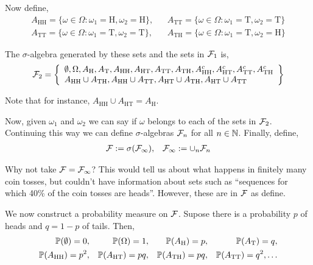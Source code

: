 \documentclass[12pt]{article}
\begin{document}
Now define,
\begin{align*}
    A_{\text{HH}} = \{\omega \in \Omega : \omega_1 = \text{H}, \omega_2 = \text{H} \}, &&
    A_{\text{TT}} = \{\omega \in \Omega : \omega_1 = \text{T}, \omega_2 = \text{T} \} \\
    A_{\text{TT}} = \{\omega \in \Omega : \omega_1 = \text{T}, \omega_2 = \text{T} \}, &&
    A_{\text{TH}} = \{\omega \in \Omega : \omega_1 = \text{T}, \omega_2 = \text{H} \}
\end{align*}

The \( \sigma \)-algebra generated by these sets and the sets in \( \mathcal{F}_1 \) is,
\begin{align*}
    \mathcal{F}_2 = \left\{\begin{array}{l}\emptyset, \Omega, A_{\text{H}}, A_{\text{T}}, A_{\text{HH}}, A_{\text{HT}}, A_{\text{TT}}, A_{\text{TH}} , A_{\text{HH}}^c, A_{\text{HT}}^c, A_{\text{TT}}^c, A_{\text{TH}}^c \\
    A_{\text{HH}}\cup A_{\text{TH}}, A_{\text{HH}}\cup A_{\text{TT}}, A_{\text{HT}}\cup A_{\text{TH}}, A_{\text{HT}}\cup A_{\text{TT}}
    \end{array}  \right\}
\end{align*}

Note that for instance, \( A_{\text{HH}} \cup A_{\text{HT}} = A_{\text{H}} \).

Now, given \( \omega_1 \) and \( \omega_2 \) we can say if \( \omega \) belongs to each of the sets in \( \mathcal{F}_2 \). Continuing this way we can define \( \sigma \)-algebras \( \mathcal{F}_n \) for all \( n\in\mathbb{N} \). Finally, define,
\begin{align*}
    \mathcal{F} := \sigma(\mathcal{F}_\infty), && \mathcal{F}_\infty := \cup_n \mathcal{F}_n
\end{align*}

Why not take \( \mathcal{F} = \mathcal{F}_\infty \)? This would tell us about what happens in finitely many coin tosses, but couldn't have information about sets such as ``sequences for which 40\% of the coin tosses are heads''. However, these are in \( \mathcal{F} \) as define.

We now construct a probability measure on \( \mathcal{F} \). Supose there is a probability \( p \) of heads and \( q = 1-p \) of tails. Then,
\begin{align*}
    \mathbb{P}(\emptyset) = 0, && \mathbb{P}(\Omega) = 1, && \mathbb{P}(A_{\text{H}}) = p, && \mathbb{P}(A_{\text{T}}) = q, \\
    \mathbb{P}(A_{\text{HH}}) = p^2, && \mathbb{P}(A_\text{HT}) = pq, && \mathbb{P}(A_\text{TH}) = pq, && \mathbb{P}(A_\text{TT}) = q^2, \ldots
\end{align*}
\end{document}
